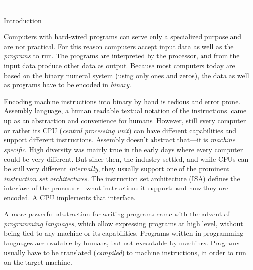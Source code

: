 {\nopagenumbers
  {\pgbackground={
    \picwidth=\pagewidth \picheight=\pageheight
    }
    \null\vfil\break}
  \null\vfil\break}
\makefront

\chap Introduction


Computers with hard-wired programs can serve only a specialized purpose and are
not practical. For this reason computers accept input data as well as the {\em
programs} to run. The programs are interpreted by the processor, and from the
input data produce other data as output. Because most computers today are based
on the binary numeral system (using only ones and zeros), the data as well as
programs have to be encoded in {\em binary}.

Encoding machine instructions into binary by hand is tedious and error prone.
Assembly language, a human readable textual notation of the instructions, came up
as an abstraction and convenience for humans.
However, still every computer or rather its CPU ({\em central processing unit})
can have different capabilities and support different instructions. Assembly
doesn't abstract that---it is {\em machine specific}. High
diversity was mainly true in the early days where every computer could be
very different. But since then, the industry settled, and while CPUs can be still
very different {\em internally}, they usually support one of the prominent {\em
instruction set architectures}. The instruction set architecture (ISA) defines
the interface of the processor---what instructions it supports and how they are
encoded. A CPU implements that interface.

A more powerful abstraction for writing programs came with the advent of {\em
programming languages}, which allow expressing programs at high level, without
being tied to any machine or its capabilities. Programs written in programming
languages are readable by humans, but not executable by machines. Programs
usually have to be translated ({\em compiled}) to machine instructions, in order
to run on the target machine.

